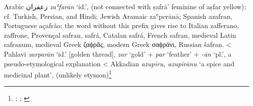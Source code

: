 \begin{etymology}\label{ety:zafaran}
Arabic {زعفران} \textit{zaʿfarān} `id.', (not connected with ṣafrā' feminine of aṣfar yellow); cf. Turkish, Persian, and Hindi; Jewish Aramaic zaʿperānā; Spanish azafran, Portuguese açafrão; the word without this prefix gives rise to Italian zafferano, zaffrone, Provençal safran, safrá, Catalan safrá, French safran, medieval Latin safranum, medieval Greek ζαϕρᾶς, modern Greek σαϕράνι, Russian šafran. 
< Pahlavi \textit{zarparān} `id.' [golden thread], \textit{zar} `gold' + \textit{par} `feather' + \textit{-ān} `pl.', a pseudo-etymological explanation
< Akkadian {} \textit{azupīru, azupīrānu} `a spice and medicinal plant', (unlikely etymon)\footnote{\textcite{wehr_dictionary_1976}; \textcites[]{asbaghi_persische_1988}[65, 98]{mackenzie_concise_1986}[safran]{ns}; \textcites[33]{black_concise_2000}[vol. 2, 530-531]{roth_assyrian_2004}}
\end{etymology}